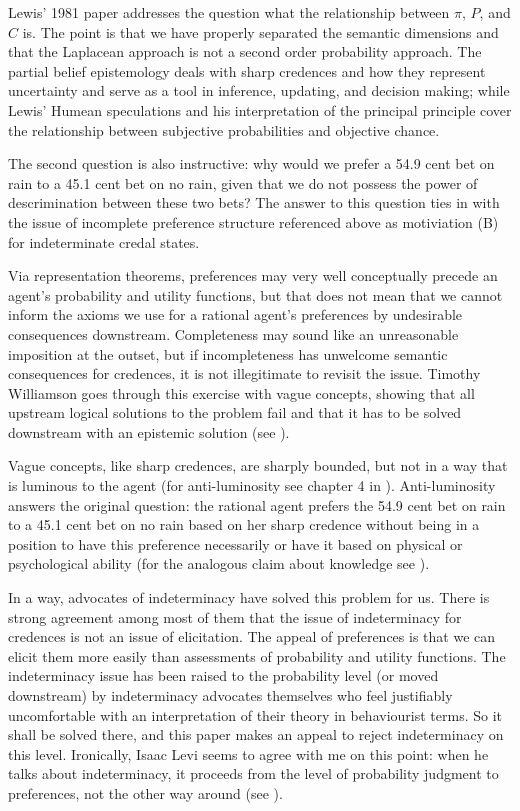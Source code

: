 \documentclass[11pt]{article}
\begin{document}
Lewis' 1981 paper 
addresses the question what the relationship between $\pi$, $P$, and
$C$ is. The point is that we have properly separated the semantic
dimensions and that the Laplacean approach is not a second order
probability approach. The partial belief epistemology deals with sharp
credences and how they represent uncertainty and serve as a tool in
inference, updating, and decision making; while Lewis' Humean
speculations and his interpretation of the principal principle cover
the relationship between subjective probabilities and objective
chance.

The second question is also instructive: why would we prefer a 54.9
cent bet on rain to a 45.1 cent bet on no rain, given that we do not
possess the power of descrimination between these two bets? The answer
to this question ties in with the issue of incomplete preference
structure referenced above as motiviation (B) for indeterminate credal
states. 

Via representation theorems, preferences may very well conceptually
precede an agent's probability and utility functions, but that does
not mean that we cannot inform the axioms we use for a rational
agent's preferences by undesirable consequences downstream.
Completeness may sound like an unreasonable imposition at the outset,
but if incompleteness has unwelcome semantic consequences for
credences, it is not illegitimate to revisit the issue. Timothy
Williamson goes through this exercise with vague concepts, showing
that all upstream logical solutions to the problem fail and that it
has to be solved downstream with an epistemic solution (see
). 

Vague concepts, like sharp credences, are sharply bounded, but not in
a way that is luminous to the agent (for anti-luminosity see chapter 4
in ). Anti-luminosity answers the original
question: the rational agent prefers the 54.9 cent bet on rain to a
45.1 cent bet on no rain based on her sharp credence without being in
a position to have this preference necessarily or have it based on
physical or psychological ability (for the analogous claim about
knowledge see ).

In a way, advocates of indeterminacy have solved this problem for us.
There is strong agreement among most of them that the issue of
indeterminacy for credences is not an issue of elicitation. The appeal
of preferences is that we can elicit them more easily than assessments
of probability and utility functions. The indeterminacy issue has been
raised to the probability level (or moved downstream) by indeterminacy
advocates themselves who feel justifiably uncomfortable with an
interpretation of their theory in behaviourist terms. So it shall be
solved there, and this paper makes an appeal to reject indeterminacy
on this level. Ironically, Isaac Levi seems to agree with me on this
point: when he talks about indeterminacy, it proceeds from the level
of probability judgment to preferences, not the other way around (see
).
\end{document}
